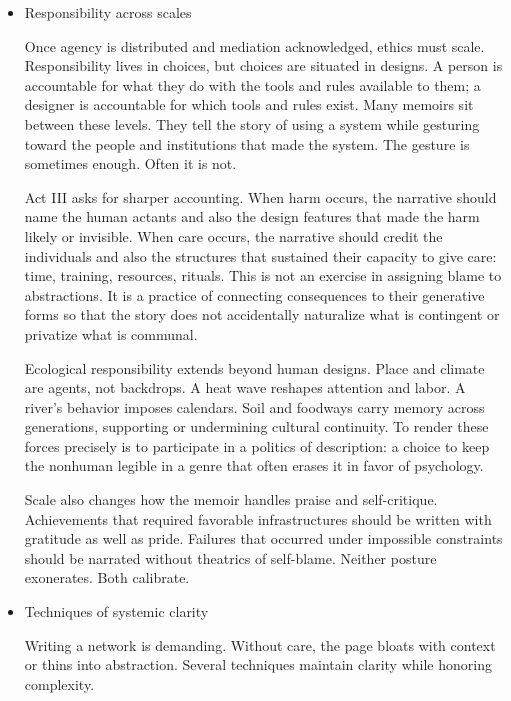\documentclass[11pt]{article}
\begin{document}
\begin{itemize}
This systemic self-maintenance does not require explicit meta-commentary. It requires consistency of cause. The memoir that behaves like a system invites trust because it demonstrates that meaning is not a byproduct of eloquence but the result of a world obeying its own laws.
\item Responsibility across scales
\label{sec:org60e6d2f}

Once agency is distributed and mediation acknowledged, ethics must scale. Responsibility lives in choices, but choices are situated in designs. A person is accountable for what they do with the tools and rules available to them; a designer is accountable for which tools and rules exist. Many memoirs sit between these levels. They tell the story of using a system while gesturing toward the people and institutions that made the system. The gesture is sometimes enough. Often it is not.

Act III asks for sharper accounting. When harm occurs, the narrative should name the human actants and also the design features that made the harm likely or invisible. When care occurs, the narrative should credit the individuals and also the structures that sustained their capacity to give care: time, training, resources, rituals. This is not an exercise in assigning blame to abstractions. It is a practice of connecting consequences to their generative forms so that the story does not accidentally naturalize what is contingent or privatize what is communal.

Ecological responsibility extends beyond human designs. Place and climate are agents, not backdrops. A heat wave reshapes attention and labor. A river’s behavior imposes calendars. Soil and foodways carry memory across generations, supporting or undermining cultural continuity. To render these forces precisely is to participate in a politics of description: a choice to keep the nonhuman legible in a genre that often erases it in favor of psychology.

Scale also changes how the memoir handles praise and self-critique. Achievements that required favorable infrastructures should be written with gratitude as well as pride. Failures that occurred under impossible constraints should be narrated without theatrics of self-blame. Neither posture exonerates. Both calibrate.
\item Techniques of systemic clarity
\label{sec:orge6d25a3}

Writing a network is demanding. Without care, the page bloats with context or thins into abstraction. Several techniques maintain clarity while honoring complexity.


\end{itemize}
\end{document}
